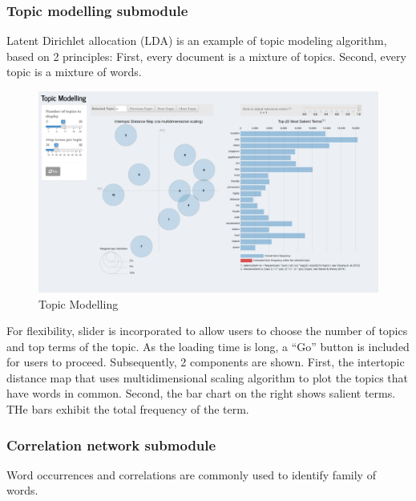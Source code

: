 \documentclass{acm_proc_article-sp}
\begin{document}
\hypertarget{topic-modelling-submodule}{%
\subsubsection{Topic modelling
submodule}\label{topic-modelling-submodule}}

Latent Dirichlet allocation (LDA) is an example of topic modeling
algorithm, based on 2 principles: First, every document is a mixture of
topics. Second, every topic is a mixture of words.

\begin{figure}[H]

{\centering \includegraphics[width=1\linewidth]{images/topicmodelling} 

}

\caption{Topic Modelling}\label{fig:unnamed-chunk-7}
\end{figure}

For flexibility, slider is incorporated to allow users to choose the
number of topics and top terms of the topic. As the loading time is
long, a ``Go'' button is included for users to proceed. Subsequently, 2
components are shown. First, the intertopic distance map that uses
multidimensional scaling algorithm to plot the topics that have words in
common. Second, the bar chart on the right shows salient terms. THe bars
exhibit the total frequency of the term.

\hypertarget{correlation-network-submodule}{%
\subsubsection{Correlation network
submodule}\label{correlation-network-submodule}}

Word occurrences and correlations are commonly used to identify family
of words.
\end{document}
